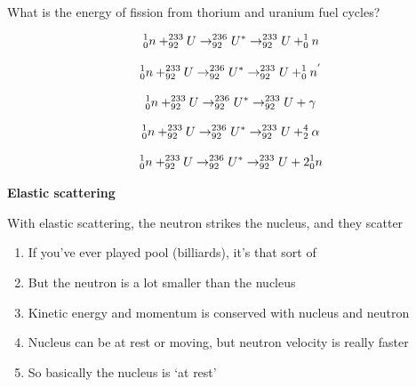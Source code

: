\documentclass[aspectratio=1610,pdftex,dvipsnames,compress,xcolor={dvipsnames}]{beamer}
\begin{document}
\begin{frame}{What is the energy of fission from thorium and uranium fuel cycles?}

    \begin{equation}
        \LARGE
        ^1_0n + ^{233}_{92}U \rightarrow ^{236}_{92}U^{*} \rightarrow ^{233}_{92}U + ^1_0n 
    \end{equation}

    \begin{equation}
        \LARGE
        ^1_0n + ^{233}_{92}U \rightarrow ^{236}_{92}U^{*} \rightarrow ^{233}_{92}U + ^1_0n^{'}
    \end{equation}

    \begin{equation}
        \LARGE
        ^1_0n + ^{233}_{92}U \rightarrow ^{236}_{92}U^{*} \rightarrow ^{233}_{92}U + \gamma   
    \end{equation}

    \begin{equation}
        \LARGE
        ^1_0n + ^{233}_{92}U \rightarrow ^{236}_{92}U^{*} \rightarrow ^{233}_{92}U + ^{4}_{2}\alpha   
    \end{equation}

    \begin{equation}
        \LARGE
        ^1_0n + ^{233}_{92}U \rightarrow ^{236}_{92}U^{*} \rightarrow ^{233}_{92}U + 2^1_0n  
    \end{equation}

\end{frame}


\begin{frame}[plain]{}
    \centering\LARGE\textbf{Elastic scattering}
\end{frame}


\addtocounter{framenumber}{-1} 
\begin{frame}{With elastic scattering, the neutron strikes the nucleus, and they scatter}
    \begin{enumerate}[series=outerlist,topsep=0pt,itemsep=21pt,leftmargin=*,label=(\arabic*)]
        \item[]If you’ve ever played pool (billiards), it’s that sort of
        \item[]But the neutron is a lot smaller than the nucleus
        \item[]Kinetic energy and momentum is conserved with nucleus and neutron
        \item[]Nucleus can be at rest or moving, but neutron velocity is really faster
        \item[]So basically the nucleus is `at rest'
    \end{enumerate}
\end{frame}
\end{document}
